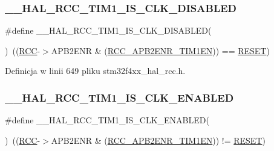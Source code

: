 \subsubsection{\texorpdfstring{\+\_\+\+\_\+\+H\+A\+L\+\_\+\+R\+C\+C\+\_\+\+T\+I\+M1\+\_\+\+I\+S\+\_\+\+C\+L\+K\+\_\+\+D\+I\+S\+A\+B\+L\+ED}{\_\_HAL\_RCC\_TIM1\_IS\_CLK\_DISABLED}}
{\footnotesize\ttfamily \#define \+\_\+\+\_\+\+H\+A\+L\+\_\+\+R\+C\+C\+\_\+\+T\+I\+M1\+\_\+\+I\+S\+\_\+\+C\+L\+K\+\_\+\+D\+I\+S\+A\+B\+L\+ED(\begin{DoxyParamCaption}{ }\end{DoxyParamCaption})~((\hyperlink{group___peripheral__declaration_ga74944438a086975793d26ae48d5882d4}{R\+CC}-\/$>$A\+P\+B2\+E\+NR \& (\hyperlink{group___peripheral___registers___bits___definition_ga25852ad4ebc09edc724814de967816bc}{R\+C\+C\+\_\+\+A\+P\+B2\+E\+N\+R\+\_\+\+T\+I\+M1\+EN})) == \hyperlink{group___exported__types_gga89136caac2e14c55151f527ac02daaffa589b7d94a3d91d145720e2fed0eb3a05}{R\+E\+S\+ET})}



Definicja w linii 649 pliku stm32f4xx\+\_\+hal\+\_\+rcc.\+h.

\mbox{\label{group___r_c_c___a_p_b2___peripheral___clock___enable___disable___status_gad2b7c3a381d791c4ee728e303935832a}} 
\subsubsection{\texorpdfstring{\+\_\+\+\_\+\+H\+A\+L\+\_\+\+R\+C\+C\+\_\+\+T\+I\+M1\+\_\+\+I\+S\+\_\+\+C\+L\+K\+\_\+\+E\+N\+A\+B\+L\+ED}{\_\_HAL\_RCC\_TIM1\_IS\_CLK\_ENABLED}}
{\footnotesize\ttfamily \#define \+\_\+\+\_\+\+H\+A\+L\+\_\+\+R\+C\+C\+\_\+\+T\+I\+M1\+\_\+\+I\+S\+\_\+\+C\+L\+K\+\_\+\+E\+N\+A\+B\+L\+ED(\begin{DoxyParamCaption}{ }\end{DoxyParamCaption})~((\hyperlink{group___peripheral__declaration_ga74944438a086975793d26ae48d5882d4}{R\+CC}-\/$>$A\+P\+B2\+E\+NR \& (\hyperlink{group___peripheral___registers___bits___definition_ga25852ad4ebc09edc724814de967816bc}{R\+C\+C\+\_\+\+A\+P\+B2\+E\+N\+R\+\_\+\+T\+I\+M1\+EN})) != \hyperlink{group___exported__types_gga89136caac2e14c55151f527ac02daaffa589b7d94a3d91d145720e2fed0eb3a05}{R\+E\+S\+ET})}



